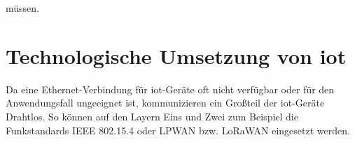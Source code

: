 müssen\cite*[]{Zaheeruddin2020}\cite*[]{10.1007/978-3-030-39875-0_20}.\\ %
\section{Technologische Umsetzung von \acrshort{iot}}\label{sec:3.3}
Da eine Ethernet-Verbindung für \acrshort{iot}-Geräte oft nicht verfügbar oder für den Anwendungsfall ungeeignet ist, kommunizieren ein Großteil der \acrshort{iot}-Geräte Drahtlos. So können auf den Layern Eins und Zwei zum Beispiel die Funkstandards IEEE 802.15.4 oder LPWAN bzw. LoRaWAN eingesetzt werden.